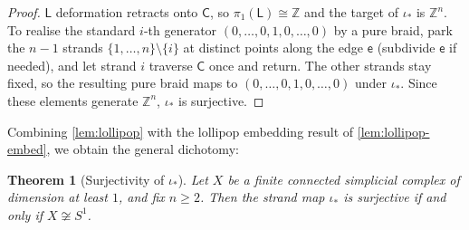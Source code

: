 \documentclass[reqno]{amsart}
\newtheorem{theorem}{Theorem}[section]
\theoremstyle{definition}
\newcommand{\Z}{\mathbb{Z}}
\newcommand{\Lollipop}{\mathsf{L}}
\numberwithin{equation}{section}
\begin{document}
\begin{proof}
\(\Lollipop\) deformation retracts onto \(\mathsf{C}\), so
\(\pi_1(\Lollipop)\cong\Z\) and the target of \(\iota_\ast\) is \(\Z^n\).
To realise the standard \(i\)-th generator \((0,\dots,0,1,0,\dots,0)\)
by a pure braid, park the \(n-1\) strands
\(\{1,\dots,n\}\setminus\{i\}\) at distinct points along the edge
\(\mathsf{e}\) (subdivide \(\mathsf{e}\) if needed), and let strand
\(i\) traverse \(\mathsf{C}\) once and return. The other strands stay
fixed, so the resulting pure braid maps to
\((0,\dots,0,1,0,\dots,0)\) under \(\iota_\ast\). Since these
elements generate \(\Z^n\), \(\iota_\ast\) is surjective.
\end{proof}

Combining \cref{lem:lollipop} with the lollipop embedding
result of \cref{lem:lollipop-embed}, we obtain the general
dichotomy:

\begin{theorem}[Surjectivity of \(\iota_\ast\)]\label{prop:iota-surj}
Let \(X\) be a finite connected simplicial complex of dimension at
least \(1\), and fix \(n\ge2\). Then the
strand map \(\iota_\ast\) is surjective if and only if \(X\not\cong S^1\).
\end{theorem}
\end{document}
